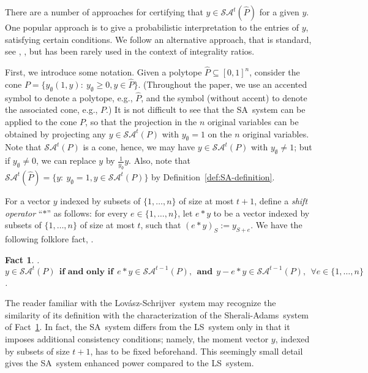 \documentclass[11pt]{article}
\newtheorem{fact}[theorem]{Fact}
\newcommand{\sa}{\textsf{Sherali-Adams}}
\newcommand{\ls}{\textsf{Lov\'asz-Schrijver}}
\newcommand{\iLS}{\textsf{LS}}
\newcommand{\iSA}{\textsf{SA}}
\newcommand\by {{y}}
\newcommand{\saop}{\mathcal{SA}}
\newcommand{\homog}[1]{{#1}}
\begin{document}
There are a number of approaches for certifying that $\by \in
\saop^t(\widehat{P})$ for a given $\by$. One popular approach is to give a
probabilistic interpretation to the entries of $\by$, satisfying
certain conditions. We follow an alternative approach, that is
standard, see \cite{Lau03}, \cite[Lemma~2.9]{tourlakisthesis06},
but has been rarely used in the context of integrality ratios.

First, we introduce some notation.
Given a polytope $\widehat{P} \subseteq [0,1]^n$,
consider the cone
$\homog{P}= \{ y_\emptyset (1, \by):~ y_\emptyset\ge0, \by \in \widehat{P}\}$.
(Throughout the paper, we use an accented symbol to denote a polytope,
e.g., $\widehat{P}$, and
the symbol (without accent) to denote the associated cone, e.g., $P$.)
It is not difficult to see
that the \iSA\ system can be applied to the cone ${P}$, so that
the projection in the $n$ original variables
can be obtained by projecting
any $y\in\saop^t({P})$ with $y_\emptyset = 1$
on the $n$ original variables.
Note that $\saop^t({P})$ is a cone, hence,
we may have $y\in\saop^t({P})$ with $y_\emptyset \not= 1$;
but if $y_\emptyset \not=0$,
we can replace $y$ by $\frac{1}{y_\emptyset} y$.
Also, note that $\saop^t(\widehat{P})=\{y:~ y_\emptyset=1, y\in
\saop^t({P})\}$ by Definition~\ref{def:SA-definition}.

For a vector $\by$ indexed by subsets of $\{1,\ldots,n\}$ of size at
most $t+1$, define a \textit{shift operator} ``$*$'' as follows:
for every $e \in \{1,\ldots,n\}$, let $e*\by$ to be a vector indexed by
subsets of $\{1,\ldots,n\}$ of size at most $t$, such that $(e*y)_S
:=y_{S + e}$.
We have the following folklore fact, \cite[Lemma~2.9]{tourlakisthesis06}.

\begin{fact}.~ \label{fact:recursive-SA}
$\by \in \saop^t({P}) ~~\textbf{if and only if}~~
e*\by \in \saop^{t-1}({P}), ~~\textbf{and}~~
\by - e*\by \in \saop^{t-1}({P}),
~~\forall e \in \{1,\ldots,n\}$.
\end{fact}


The reader familiar with the \ls\ system may recognize the similarity
of its definition with the characterization of the \sa\ system of
Fact~\ref{fact:recursive-SA}. In fact, the \iSA\ system differs from
the \iLS\ system only in that it imposes additional consistency
conditions; namely, the moment vector $\by$, indexed by subsets of size
$t+1$, has to be fixed beforehand.
This seemingly small detail gives the \iSA\ system enhanced power
compared to the \iLS\ system.
\end{document}

